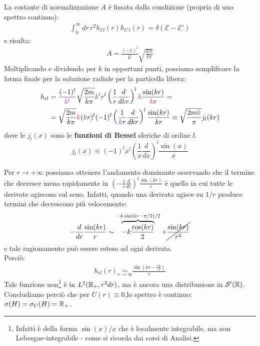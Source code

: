 \documentclass[../../FisicaTeorica.tex]{subfiles}
\begin{document}
La costante di normalizzazione $A$ è fissata dalla condizione (propria di uno spettro continuo):
\begin{align*}
\int_0^\infty dr\, r^2 h_{\mathcal{E}l}(r) h_{\mathcal{E}'l}(r) = \delta(\mathcal{E}-\mathcal{E}')
\end{align*}
e risulta:
\begin{align*}
A=
\frac{(-1)^l}{k^l}\sqrt{\frac{2m}{k\pi}}
\end{align*}
Moltiplicando e dividendo per $k$ in opportuni punti, possiamo semplificare la forma finale per la soluzione radiale per la particella libera:
\begin{align*}
h_{\epsilon l} &= \frac{(-1)^l}{\textcolor{Purple}{k^l}}\sqrt{\frac{2m}{k\pi}} \textcolor{Blue}{k^l} r^l \left(\frac{1}{r}\frac{d}{d\textcolor{Blue}{k}r}\right)^l \textcolor{Red}{k}\frac{\sin(kr)}{\textcolor{Red}{k}r}=\\
&= \sqrt{\frac{2m}{k\pi}} \textcolor{Red}{k} (\textcolor{Blue}{k}r)^l (-1)^l \left(\frac{1}{\textcolor{Purple}{k}r}\frac{d}{dkr}\right)^l \frac{\sin(kr)}{kr} \equiv \sqrt{\frac{2m\textcolor{Red}{k}}{\pi}} j_l(kr)
\end{align*}
dove le $j_l(x)$ sono le \textbf{funzioni di Bessel} sferiche di ordine $l$.\\
\[
j_l(x) \equiv (-1)^l x^l \left(\frac{1}{x} \frac{d}{dx}\right)^l \frac{\sin(x)}{x}
\]


Per $r\to +\infty$ possiamo ottenere l'andamento dominante osservando che il termine che decresce meno rapidamente in $\left(-\frac{1}{r}\frac{d}{dr}\right)^l \frac{\sin(kr)}{r}$ è quello in cui tutte le derivate agiscono sul seno. Infatti, quando una derivata agisce su $1/r$ produce termini che decrescono più velocemente:
\begin{align*}
-\frac{d}{dr} \frac{\sin(kr)}{r} \sim \overbrace{-k\frac{\cos(kr)}{2}}^{-k\sin(kr-\pi/2)/2} + \cancel{\frac{\sin(kr)}{r^2}}
\end{align*} 
e tale ragionamento può essere esteso ad ogni derivata.\\
Perciò:
\begin{align*}
h_{\epsilon l}(r) \underset{r\to \infty}{\sim} \frac{\sin(kr - l\frac{\pi}{2})}{r}
\end{align*}
Tale funzione non\footnote{Infatti è della forma $\sin(x)/x$ che è localmente integrabile, ma non Lebesgue-integrabile - come si ricorda dai corsi di Analisi.} è in $L^2(\mathbb{R}_+, r^2 dr)$, ma è ancora una distribuzione in $\mathcal{S}'(\mathbb{R})$.\\
Concludiamo perciò che per $U(r)\equiv 0$,lo spettro è continuo: $\sigma(H)= \sigma_C(H) =\mathbb{R}_+$.\\
\end{document}
